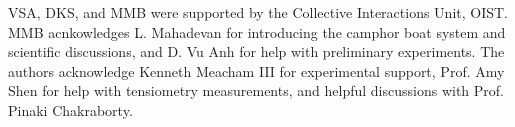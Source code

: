 \documentclass[journal=langd5, manuscript=article, layout=twocolumn]{achemso}
\begin{document}
\begin{acknowledgement}
VSA, DKS, and MMB were supported by the Collective Interactions Unit, OIST. MMB acnkowledges L. Mahadevan for introducing the camphor boat system and scientific discussions, and D. Vu Anh for help with preliminary experiments. The authors acknowledge Kenneth Meacham III for experimental support, Prof. Amy Shen for help with tensiometry measurements, and helpful discussions with Prof. Pinaki Chakraborty.
\end{acknowledgement}






\end{document}
